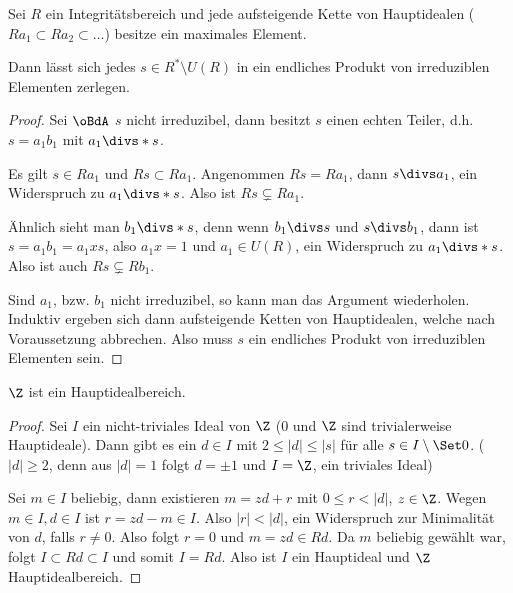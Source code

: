 \begin{lem} \label{1.8}
	Sei $R$ ein Integritätsbereich und jede aufsteigende Kette von Hauptidealen ($Ra_1 \subset Ra_2 \subset \dotsc$) besitze ein maximales Element.

	Dann lässt sich jedes $s \in R^* \setminus U(R)$ in ein endliches Produkt von irreduziblen Elementen zerlegen.
	\begin{proof}
		Sei $\oBdA$ $s$ nicht irreduzibel, dann besitzt $s$ einen echten Teiler, d.h. $s = a_1 b_1$ mit $a_1 \divs*  s$.

		Es gilt $s \in Ra_1$ und $Rs \subset Ra_1$.
		Angenommen $Rs = Ra_1$, dann $s \divs  a_1$, ein Widerspruch zu $a_1 \divs*  s$.
		Also ist $Rs \subsetneq Ra_1$.

		Ähnlich sieht man $b_1 \divs*  s$, denn wenn $b_1 \divs  s$ und $s \divs  b_1$, dann ist $s = a_1 b_1 = a_1 x s$, also $a_1 x = 1$ und $a_1 \in U(R)$, ein Widerspruch zu $a_1 \divs* s$.
		Also ist auch $Rs \subsetneq Rb_1$.

		Sind $a_1$, bzw. $b_1$ nicht irreduzibel, so kann man das Argument wiederholen.
		Induktiv ergeben sich dann aufsteigende Ketten von Hauptidealen, welche nach Voraussetzung abbrechen.
		Also muss $s$ ein endliches Produkt von irreduziblen Elementen sein.
	\end{proof}
\end{lem}

\begin{lem} \label{1.9}
	$\Z$ ist ein Hauptidealbereich.
	\begin{proof}
		Sei $I$ ein nicht-triviales Ideal von $\Z$ ($0$ und $\Z$ sind trivialerweise Hauptideale).
		Dann gibt es ein $d \in I$ mit $2 \le |d| \le |s|$ für alle $s \in I \setminus \Set 0$.
		($|d| \ge 2$, denn aus $|d|=1$ folgt $d = \pm 1$ und $I = \Z$, ein triviales Ideal)

		Sei $m \in I$ beliebig, dann existieren $m = zd + r$ mit $0 \le r < |d|$, $z \in \Z$.
		Wegen $m \in I, d\in I$ ist $r = zd - m \in I$.
		Also $|r| < |d|$, ein Widerspruch zur Minimalität von $d$, falls $r \neq 0$.
		Also folgt $r = 0$ und $m = zd \in Rd$.
		Da $m$ beliebig gewählt war, folgt $I \subset Rd \subset I$ und somit $I = Rd$.
		Also ist $I$ ein Hauptideal und $\Z$ Hauptidealbereich.
	\end{proof}
\end{lem}

